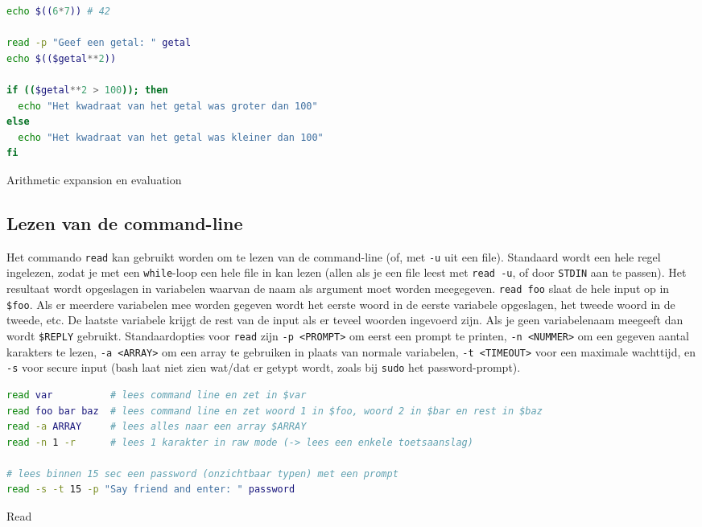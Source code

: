 \begin{listing}
\begin{lstlisting}[language=Bash]
echo $((6*7)) # 42

read -p "Geef een getal: " getal
echo $(($getal**2))

if (($getal**2 > 100)); then
  echo "Het kwadraat van het getal was groter dan 100"
else
  echo "Het kwadraat van het getal was kleiner dan 100"
fi
\end{lstlisting}
\caption{Arithmetic expansion en evaluation}
\end{listing}

\subsection{Lezen van de command-line}\label{lezen-van-de-command-line}

Het commando \texttt{read} kan gebruikt worden om te lezen van de command-line (of, met \texttt{-u} uit een file). Standaard wordt een hele regel ingelezen, zodat je met een \texttt{while}-loop een hele file in kan lezen (allen als je een file leest met \texttt{read\ -u}, of door \texttt{STDIN} aan te passen). Het resultaat wordt opgeslagen in variabelen waarvan de naam als argument moet worden meegegeven. \texttt{read\ foo} slaat de hele input op in \texttt{\$foo}. Als er meerdere variabelen mee worden gegeven wordt het eerste woord in de eerste variabele opgeslagen, het tweede woord in de tweede, etc. De laatste variabele krijgt de rest van de input als er teveel woorden ingevoerd zijn. Als je geen variabelenaam meegeeft dan wordt \texttt{\$REPLY} gebruikt. Standaardopties voor \texttt{read} zijn \texttt{-p\ \textless{}PROMPT\textgreater{}} om eerst een prompt te printen, \texttt{-n\ \textless{}NUMMER\textgreater{}} om een gegeven aantal karakters te lezen, \texttt{-a\ \textless{}ARRAY\textgreater{}} om een array te gebruiken in plaats van normale variabelen, \texttt{-t\ \textless{}TIMEOUT\textgreater{}} voor een maximale wachttijd, en \texttt{-s} voor secure input (bash laat niet zien wat/dat er getypt wordt, zoals bij \texttt{sudo} het password-prompt).

\begin{listing}
\begin{lstlisting}[language=Bash]
read var          # lees command line en zet in $var
read foo bar baz  # lees command line en zet woord 1 in $foo, woord 2 in $bar en rest in $baz
read -a ARRAY     # lees alles naar een array $ARRAY
read -n 1 -r      # lees 1 karakter in raw mode (-> lees een enkele toetsaanslag)

# lees binnen 15 sec een password (onzichtbaar typen) met een prompt
read -s -t 15 -p "Say friend and enter: " password
\end{lstlisting}
\caption{Read}
\end{listing}

